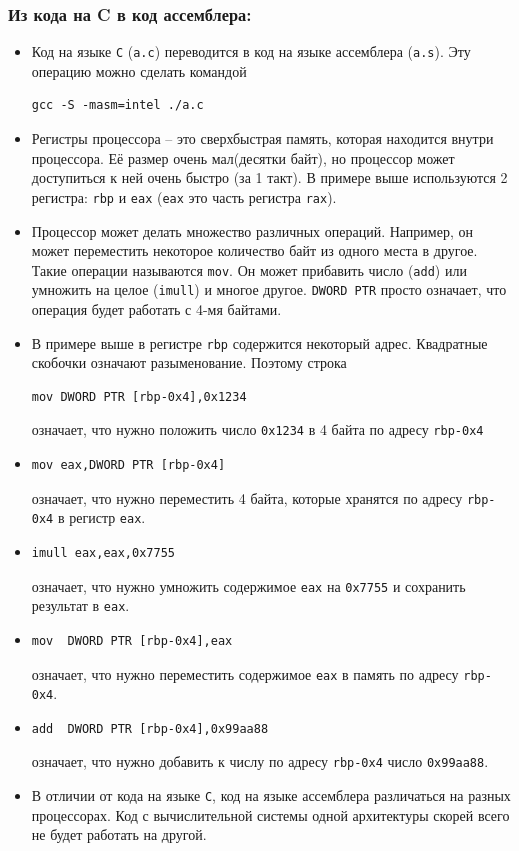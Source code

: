 \documentclass{article}
\begin{document}
\subsubsection*{Из кода на C в код ассемблера:}
\begin{itemize}
\item Код на языке \texttt{C} (\texttt{a.c}) переводится в код на языке ассемблера (\texttt{a.s}). Эту операцию можно сделать командой
\begin{verbatim}
gcc -S -masm=intel ./a.c
\end{verbatim}
\item Регистры процессора -- это сверхбыстрая память, которая находится внутри процессора. Её размер очень мал(десятки байт), но процессор может доступиться к ней очень быстро (за 1 такт). В примере выше используются 2 регистра: \texttt{rbp} и \texttt{eax} (\texttt{eax} это часть регистра \texttt{rax}). 
\item Процессор может делать множество различных операций. Например, он может переместить некоторое количество байт из одного места в другое. Такие операции называются \texttt{mov}. Он может прибавить число (\texttt{add}) или умножить на целое (\texttt{imull}) и многое другое. \texttt{DWORD PTR} просто означает, что операция будет работать с 4-мя байтами.
\item В примере выше в регистре \texttt{rbp} содержится некоторый адрес. Квадратные скобочки означают разыменование. Поэтому строка
\begin{verbatim}
mov DWORD PTR [rbp-0x4],0x1234
\end{verbatim}
означает, что нужно положить число \texttt{0x1234} в 4 байта по адресу \texttt{rbp-0x4}
\item 
\begin{verbatim}
mov eax,DWORD PTR [rbp-0x4]
\end{verbatim}
означает, что нужно переместить 4 байта, которые хранятся по адресу \texttt{rbp-0x4} в регистр \texttt{eax}.
\item
\begin{verbatim}
imull eax,eax,0x7755
\end{verbatim}
означает, что нужно умножить содержимое \texttt{eax} на \texttt{0x7755} и сохранить результат в \texttt{eax}.
\item
\begin{verbatim}
mov  DWORD PTR [rbp-0x4],eax
\end{verbatim}
означает, что нужно переместить содержимое \texttt{eax} в память по адресу \texttt{rbp-0x4}.
\item
\begin{verbatim}
add  DWORD PTR [rbp-0x4],0x99aa88
\end{verbatim}
означает, что нужно добавить к числу по адресу \texttt{rbp-0x4} число \texttt{0x99aa88}.
\item В отличии от кода на языке \texttt{C}, код на языке ассемблера различаться на разных процессорах. Код с  вычислительной системы одной архитектуры скорей всего не будет работать на другой.
\end{itemize}
\end{document}
